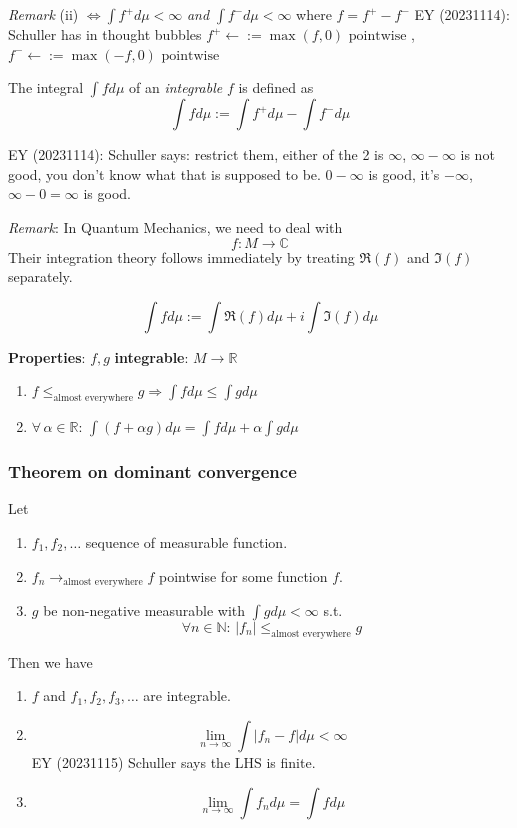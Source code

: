 \emph{Remark} (ii) $\Longleftrightarrow \int f^+ d\mu < \infty$ \emph{and} $\int f^- d\mu < \infty$ where $f = f^+ - f^-$ EY (20231114): Schuller has in thought bubbles $f^+ \leftarrow := \max{(f,0)} \text{ pointwise }$, $f^- \leftarrow := \max{(-f, 0)} \text{ pointwise }$

\begin{definition} The integral $\int fd\mu$ of an \emph{integrable} $f$ is defined as 
	\[
	\int f d\mu := \int f^+ d\mu - \int f^- d\mu
	\]
\end{definition}
EY (20231114): Schuller says: restrict them, either of the 2 is $\infty$, $\infty - \infty$ is not good, you don't know what that is supposed to be. $0 - \infty$ is good, it's $-\infty$, $\infty - 0 = \infty$ is good.

\emph{Remark}: In Quantum Mechanics, we need to deal with 
\[
f: M \to \mathbb{C}
\]
Their integration theory follows immediately by treating $\Re{(f)}$ and $\Im{(f)}$ separately.

\[
\int f d\mu := \int \Re{(f)} d\mu + i \int \Im{(f)} d\mu
\]

\textbf{Properties}: $f,g$ \textbf{integrable}: $M \to \mathbb{R}$
\begin{enumerate}
	\item[(i)] $f \leq_{\text{almost everywhere}} g \Longrightarrow \int f d\mu \leq \int g d\mu$
	\item[(ii)] $\forall \, \alpha \in \mathbb{R}$: $\int (f+\alpha g) d\mu = \int f d\mu + \alpha \int g d\mu$
\end{enumerate}

\subsubsection*{Theorem on dominant convergence}

\begin{theorem}
	Let \begin{enumerate}
		\item[(a)] $f_1, f_2, \dots$ sequence of measurable function. 
		\item[(b)] $f_n \to_{\text{almost everywhere}} f$ pointwise for some function $f$. 
		\item[(c)] $g$ be non-negative measurable with $\int g d\mu < \infty$ s.t.
		\[
		\forall n \in \mathbb{N} : \, |f_n| \leq_{\text{almost everywhere}} g
		\]
	\end{enumerate}
\end{theorem}

Then we have
\begin{enumerate}
	\item[(i)] $f$ and $f_1, f_2, f_3, \dots$ are integrable.
	\item[(ii)] \[
	\lim_{n\to \infty} \int |f_n - f| d\mu < \infty
	\] EY (20231115) Schuller says the LHS is finite.
	\item[(iii)] 
	\[
	\lim_{n\to \infty} \int f_n d\mu = \int f d\mu
	\]
\end{enumerate}

